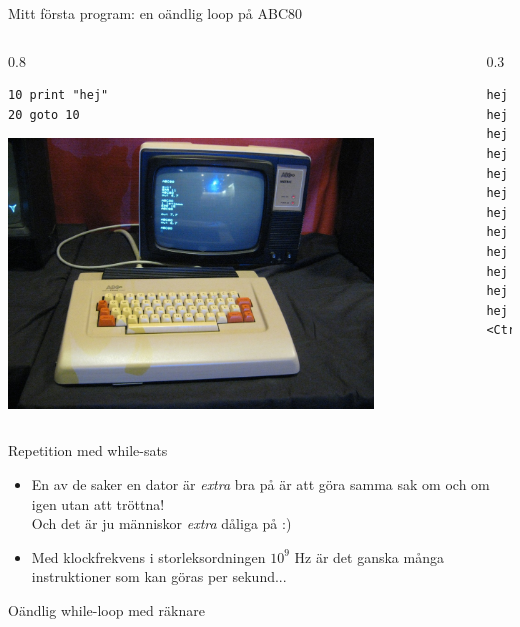 \documentclass{lecturenotes}
\begin{document}
\begin{Slide}{Mitt första program: en oändlig loop på ABC80}
\begin{columns}
\begin{column}{0.8\textwidth}
\begin{verbatim}
10 print "hej"
20 goto 10
\end{verbatim}
\includegraphics[width=0.8\textwidth]{img/abc80.jpg}
\end{column}
\begin{column}{0.3\textwidth}
\pause
\begin{verbatim}
hej
hej
hej
hej
hej
hej
hej
hej
hej
hej
hej
hej
<Ctrl+C>
\end{verbatim}

\end{column}
\end{columns}
\end{Slide}

\begin{Slide}{Repetition med while-sats}

\pause
\begin{itemize}
\item En av de saker en dator är \textit{extra} bra på är att göra samma sak om och om igen utan att tröttna! \\
Och det är ju människor \textit{extra} dåliga på :)
\item Med klockfrekvens i storleksordningen $10^9$ Hz är det ganska många instruktioner som kan göras per sekund...
\end{itemize}
\end{Slide}

\begin{Slide}{Oändlig while-loop med räknare}

\end{Slide}
\end{document}
